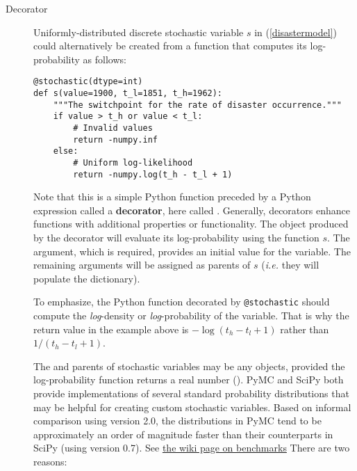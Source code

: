 \begin{description}
    \item[Decorator] Uniformly-distributed discrete stochastic variable $s$ in (\ref{disastermodel}) could alternatively be created from a function that computes its log-probability as follows:
\begin{verbatim}
@stochastic(dtype=int)
def s(value=1900, t_l=1851, t_h=1962):
    """The switchpoint for the rate of disaster occurrence."""
    if value > t_h or value < t_l:
        # Invalid values
        return -numpy.inf
    else:
        # Uniform log-likelihood
        return -numpy.log(t_h - t_l + 1)
\end{verbatim}
Note that this is a simple Python function preceded by a Python expression called a \textbf{decorator}, here called . Generally, decorators enhance functions with additional properties or functionality. The  object produced by the  decorator will evaluate its log-probability using the function $s$. The  argument, which is required, provides an initial value for the variable. The remaining arguments will be assigned as parents of $s$ (\emph{i.e.} they will populate the  dictionary).

To emphasize, the Python function decorated by \texttt{@stochastic} should compute the \emph{log}-density or \emph{log}-probability of the variable. That is why the return value in the example above is $-\log(t_h-t_l+1)$ rather than $1/(t_h-t_l+1)$.

The  and parents of stochastic variables may be any objects, provided the log-probability function returns a real number (). PyMC and SciPy both provide implementations of several standard probability distributions that may be helpful for creating custom stochastic variables. Based on informal comparison using version 2.0, the distributions in PyMC tend to be approximately an order of magnitude faster than their counterparts in SciPy (using version 0.7). See \href{http://code.google.com/p/pymc/wiki/Benchmarks}{the wiki page on benchmarks}  There are two reasons: 


\end{description}
